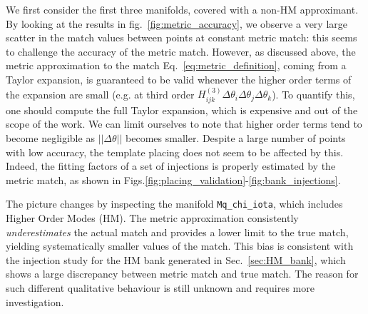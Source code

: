 \documentclass[twocolumn,showpacs,preprintnumbers,nofootinbib,prd,
superscriptaddress,10pt]{revtex4-2}
\begin{document}
We first consider the first three manifolds, covered with a non-HM approximant.
By looking at the results in fig.~\ref{fig:metric_accuracy}, we observe a very large scatter in the match values between points at constant metric match: this seems to challenge the accuracy of the metric match.
However, as discussed above, the metric approximation to the match Eq.~\eqref{eq:metric_definition}, coming from a Taylor expansion, is guaranteed to be valid whenever the higher order terms of the expansion are small (e.g. at third order $H^{(3)}_{ijk}\Delta\theta_i\Delta\theta_j\Delta\theta_k$). To quantify this, one should compute the full Taylor expansion, which is expensive and out of the scope of the work.
We can limit ourselves to note that higher order terms tend to become negligible as $||\Delta\theta||$ becomes smaller.
%
%
Despite a large number of points with low accuracy, the template placing does not seem to be affected by this. Indeed, the fitting factors of a set of injections is properly estimated by the metric match, as shown in Figs.\ref{fig:placing_validation}-\ref{fig:bank_injections}.

The picture changes by inspecting the manifold \texttt{Mq\_chi\_iota}, which includes Higher Order Modes (HM).
The metric approximation consistently {\it underestimates} the actual match and provides a lower limit to the true match, yielding systematically smaller values of the match.
This bias is consistent with the injection study for the HM bank generated in Sec.~\ref{sec:HM_bank}, which shows a large discrepancy between metric match and true match.
The reason for such different qualitative behaviour is still unknown and requires more investigation. 
\end{document}
